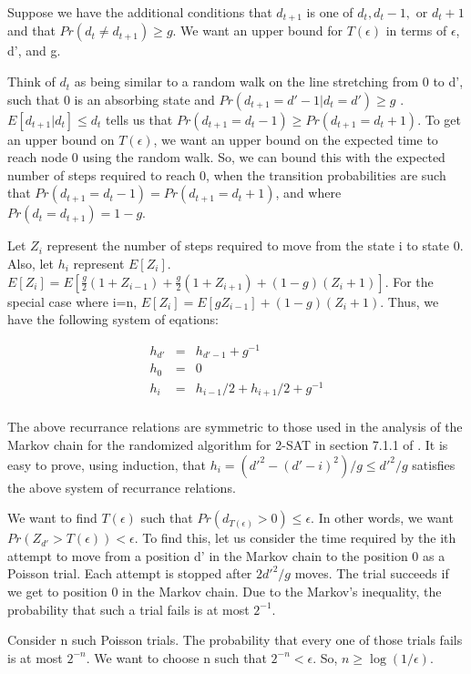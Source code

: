 \documentclass[10pt]{amsart}
\theoremstyle{remark}
\begin{document}
Suppose we have the additional conditions that $d_{t+1}$ is one of $d_{t}, d_{t}-1,$ or $d_{t}+1$ and that $Pr(d_{t} \neq d_{t+1})\geq g$. We want an upper bound for $T(\epsilon)$ in terms of $\epsilon$, d', and g. 

Think of $d_{t}$ as being similar to a random walk on the line stretching from 0 to d', such that 0 is an absorbing state and $Pr(d_{t+1}=d'-1|d_{t}=d') \geq g$ . $E[d_{t+1}|d_{t}]\leq d_{t}$ tells us that $Pr(d_{t+1}=d_{t}-1) \geq Pr(d_{t+1}=d_{t}+1)$. To get an upper bound on $T(\epsilon)$, we want an upper bound on the expected time to reach node 0 using the random walk. So, we can bound this with the expected number of steps required to reach 0, when the transition probabilities are such that $Pr(d_{t+1}=d_{t}-1) = Pr(d_{t+1}=d_{t}+1)$, and where $Pr(d_{t} = d_{t+1}) = 1-g$.

Let $Z_{i}$ represent the number of steps required to move from the state i to state 0. Also, let $h_{i}$ represent $E[Z_{i}]$. $E[Z_{i}]=E[\frac{g}{2}(1+Z_{i-1})+\frac{g}{2}(1+Z_{i+1})+(1-g)(Z_{i}+1)]$. For the special case where i=n, $E[Z_{i}]=E[gZ_{i-1}]+(1-g)(Z_{i}+1)$. Thus, we have the following system of eqations:

\begin{eqnarray}
h_{d'} &=& h_{d'-1}+g^{-1}\\
h_{0} &=& 0\\
h_{i} &=& h_{i-1}/2 + h_{i+1}/2 + g^{-1}\\
\end{eqnarray} 

The above recurrance relations are symmetric to those used in the analysis of the Markov chain for the randomized algorithm for 2-SAT in section 7.1.1 of \cite{mitzenmacherUpfal}. It is easy to prove, using induction, that $h_{i}=(d'^{2}-(d'-i)^{2})/g \leq d'^{2}/g$ satisfies the above system of recurrance relations.

We want to find $T(\epsilon)$ such that $Pr(d_{T(\epsilon)}>0) \leq \epsilon$. In other words, we want $Pr(Z_{d'}>T(\epsilon))<\epsilon$. To find this, let us consider the time required by the ith attempt to move from a position d' in the Markov chain to the position 0 as a Poisson trial. Each attempt is stopped after $2d'^{2}/g$ moves. The trial succeeds if we get to position 0 in the Markov chain. Due to the Markov's inequality, the probability that such a trial fails is at most $2^{-1}$.

Consider n such Poisson trials. The probability that every one of those trials fails is at most $2^{-n}$. We want to choose n such that $2^{-n}<\epsilon$. So, $n \geq \log (1/\epsilon)$.
\end{document}
